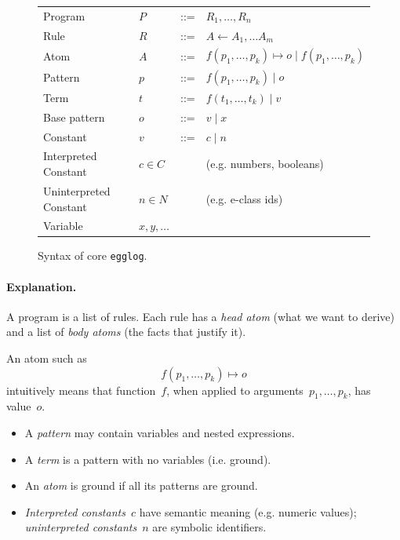 \documentclass[acmsmall,screen, nonacm, anonymous]{acmart}
\begin{document}
\begin{figure}[h]
  \centering
  \begin{tabular}{llcl}
     Program        & $P$ & ::= & $R_1,\ldots, R_n$ \\
     Rule           & $R$ & ::= & $A \gets A_1,\ldots A_m$ \\
     Atom           & $A$ & ::= & $f(p_1,\ldots, p_k)\mapsto o
                                  \mid f(p_1,\ldots, p_k)$ \\
     Pattern        & $p$ & ::= & $f(p_1,\ldots, p_k)\mid o$ \\
     Term           & $t$ & ::= & $f(t_1,\ldots, t_k)\mid v$ \\
     Base pattern   & $o$ & ::= & $v\mid x$ \\
     Constant       & $v$ & ::= & $c\mid n$ \\
     Interpreted Constant & $c\in C$ & & (e.g. numbers, booleans)\\
     Uninterpreted Constant & $n\in N$ & & (e.g. e-class ids)\\
     Variable       & $x, y, \ldots$ &
  \end{tabular}
  \caption{Syntax of core \texttt{egglog}.}
  \label{fig:syntax}
\end{figure}

\paragraph{Explanation.}
A program is a list of rules.
Each rule has a \emph{head atom} (what we want to derive)
and a list of \emph{body atoms} (the facts that justify it).

An atom such as
\[
  f(p_1, \ldots, p_k) \mapsto o
\]
intuitively means that function~$f$,
when applied to arguments~$p_1,\ldots,p_k$,
has value~$o$.

\begin{itemize}
  \item A \emph{pattern} may contain variables and nested expressions.
  \item A \emph{term} is a pattern with no variables (i.e. ground).
  \item An \emph{atom} is ground if all its patterns are ground.
  \item \emph{Interpreted constants}~$c$ have semantic meaning
        (e.g. numeric values);
        \emph{uninterpreted constants}~$n$ are symbolic identifiers.
\end{itemize}


\end{document}

